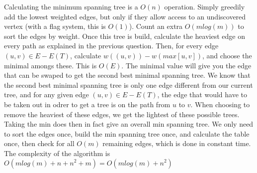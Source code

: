 \documentclass{scrartcl}
\begin{document}
Calculating the minimum spanning tree is a \( O(n) \) operation. Simply greedily add the lowest weighted edges, but only if they allow access to an undiscovered vertex (with a flag system, this is \( O(1) \)).
Count an extra \( O(mlog(m)) \) to sort the edges by weight.
Once this tree is build, calculate the heaviest edge on every path as explained in the previous question.
Then, for every edge\((u,v) \in  E - E(T) \), calculate \( w((u,v)) - w(max[u,v]) \), and choose the minimal amongs these.
This is \( O(E) \). The minimal value will give you the edge that can be swaped to get the second best minimal spanning tree.
We know that the second best minimal spanning tree is only one edge different from our current tree, and for any given edge \( (u,v) \in E - E(T) \), the edge that would have to be taken out in odrer to get a tree is on the path from \(u \) to \( v \). When choosing to remove the heaviest of these edges, we get the lightest of these possible trees. Taking the min does then in fact give an overall min spanning tree.
We only need to sort the edges once, build the min spanning tree once, and calculate the table once, then check for all \( O(m) \) remaining edges, which is done in constant time.
The complexity of the algorithm is \( O(mlog(m) + n + n^2 + m) = O(mlog(m) + n^2) \)




\end{document}
